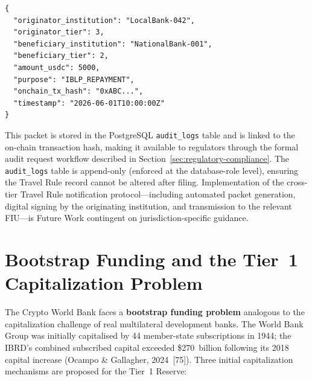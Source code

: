 \documentclass[12pt,a4paper]{report}
\begin{document}
\begin{verbatim}
{
  "originator_institution": "LocalBank-042",
  "originator_tier": 3,
  "beneficiary_institution": "NationalBank-001",
  "beneficiary_tier": 2,
  "amount_usdc": 5000,
  "purpose": "IBLP_REPAYMENT",
  "onchain_tx_hash": "0xABC...",
  "timestamp": "2026-06-01T10:00:00Z"
}
\end{verbatim}

\noindent This packet is stored in the PostgreSQL \texttt{audit\_logs} table and is linked to the on-chain transaction hash, making it available to regulators through the formal audit request workflow described in Section~\ref{sec:regulatory-compliance}. The \texttt{audit\_logs} table is append-only (enforced at the database-role level), ensuring the Travel Rule record cannot be altered after filing. Implementation of the cross-tier Travel Rule notification protocol---including automated packet generation, digital signing by the originating institution, and transmission to the relevant FIU---is Future Work contingent on jurisdiction-specific guidance.

\section{Bootstrap Funding and the Tier~1 Capitalization Problem}

The Crypto World Bank faces a \textbf{bootstrap funding problem} analogous to the capitalization challenge of real multilateral development banks. The World Bank Group was initially capitalised by 44 member-state subscriptions in 1944; the IBRD's combined subscribed capital exceeded \$270~billion following its 2018 capital increase (Ocampo \& Gallagher, 2024~[75]). Three initial capitalization mechanisms are proposed for the Tier~1 Reserve:
\end{document}
